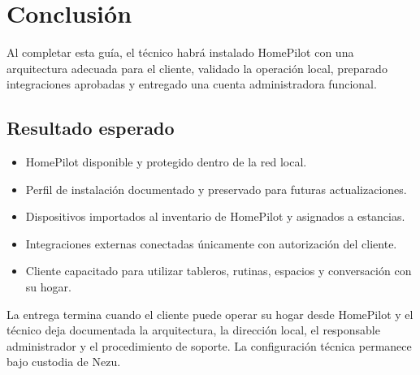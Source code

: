 \section{Conclusión}

Al completar esta guía, el técnico habrá instalado HomePilot con una arquitectura adecuada para el cliente, validado la operación local, preparado integraciones aprobadas y entregado una cuenta administradora funcional.

\subsection{Resultado esperado}
\begin{itemize}[itemsep=0.15cm]
    \item HomePilot disponible y protegido dentro de la red local.
    \item Perfil de instalación documentado y preservado para futuras actualizaciones.
    \item Dispositivos importados al inventario de HomePilot y asignados a estancias.
    \item Integraciones externas conectadas únicamente con autorización del cliente.
    \item Cliente capacitado para utilizar tableros, rutinas, espacios y conversación con su hogar.
\end{itemize}

\begin{tcolorbox}[title=Entrega profesional]
La entrega termina cuando el cliente puede operar su hogar desde HomePilot y el técnico deja documentada la arquitectura, la dirección local, el responsable administrador y el procedimiento de soporte. La configuración técnica permanece bajo custodia de Nezu.
\end{tcolorbox}
